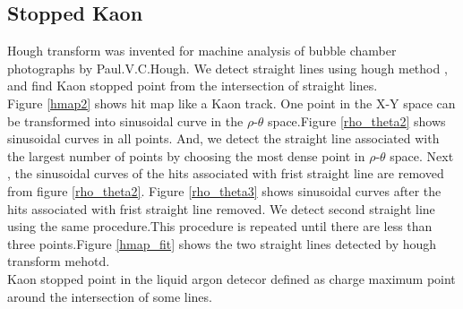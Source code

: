 \subsection{Stopped Kaon}
Hough transform was invented for machine analysis of bubble chamber photographs by Paul.V.C.Hough.\cite{3069654}
We detect straight lines using hough method , and find Kaon stopped point from the intersection of straight lines.\\
Figure \ref{hmap2} shows hit map like a Kaon track.
One point in the X-Y space can be transformed into sinusoidal curve in the $\rho$-$\theta$ space.Figure \ref{rho_theta2} shows sinusoidal curves in all points.
And, we detect the straight line associated with the largest number of points by choosing the most dense point in $\rho$-$\theta$ space.
Next , the sinusoidal curves of the hits associated with frist straight line are removed from figure \ref{rho_theta2}.
Figure \ref{rho_theta3} shows sinusoidal curves after the hits associated with frist straight line removed.
We detect second straight line using the same procedure.This procedure is repeated until there are less than three points.Figure \ref{hmap_fit} shows the two straight lines detected by hough transform mehotd.\\
Kaon stopped point in the liquid argon detecor defined as charge maximum point around the intersection of some lines.


